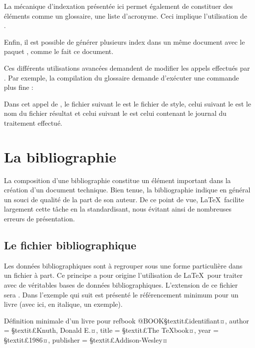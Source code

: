 La mécanique d'indexation présentée ici permet également de constituer des éléments comme un glossaire, une liste d'acronyme. Ceci implique l'utilisation de .

Enfin, il est possible de générer plusieurs index dans un même document avec le paquet , comme le fait ce document.

Ces différents utilisations avancées demandent de modifier les appels effectués par . Par exemple, la compilation du glossaire demande d'exécuter une commande plus fine :

\begin{codesimple}{Appel générique de makeindex}{appelmakeindex}
makeindex -s §textit£fichier¤.ist -t §textit£fichier¤.glg -o §textit£fichier¤.gls §textit£fichier¤.glo}
\end{codesimple}

Dans cet appel de , le fichier suivant le  est le fichier de style, celui suivant le  est le nom du fichier résultat et celui suivant le  est celui contenant le journal du traitement effectué.


\section{La bibliographie}  

La composition d'une bibliographie constitue un élément important dans la création d'un document technique. Bien tenue, la bibliographie indique en général un souci de qualité de la part de son auteur. De ce point de vue, \LaTeX\ facilite largement cette tâche en la standardisant, nous évitant ainsi de nombreuses erreurs de présentation.


\subsection{Le fichier bibliographique}
 
Les données bibliographiques sont à regrouper sous une forme particulière dans un fichier à part. Ce principe a pour origine l'utilisation de \LaTeX\ pour traiter avec de véritables bases de données bibliographiques. L'extension de ce fichier sera . Dans l'exemple qui suit est présenté le référencement minimum pour un livre (avec ici, en italique, un exemple).

\begin{codesimple}{Définition minimale d'un livre pour \BibTeX}{refbook}
@BOOK{§textit£identifiant¤,
  author = {§textit£Knuth, Donald E.¤},
  title = {§textit£The \TeX book¤},
  year = {§textit£1986¤},
  publisher = {§textit£Addison-Wesley¤}}
\end{codesimple}

